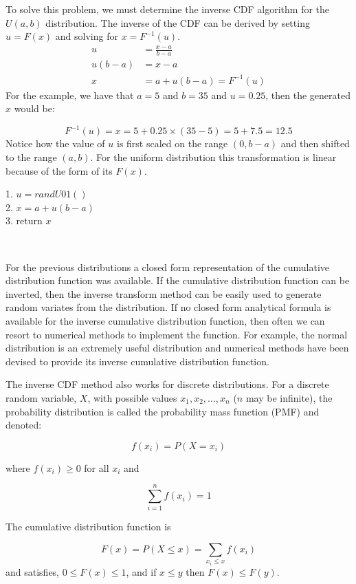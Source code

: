 \documentclass[
]{book}
\theoremstyle{definition}
\theoremstyle{definition}
\theoremstyle{definition}
\theoremstyle{definition}
\theoremstyle{remark}
\begin{document}
To solve this problem, we must determine the inverse CDF algorithm for the \(U(a,b)\) distribution. The inverse of the CDF can be derived by setting \(u = F(x)\) and solving
for \(x = F^{-1}(u)\).
\[
\begin{split}
u & = \frac{x-a}{b-a}\\
u(b-a) &= x-a \\
x & = a + u(b-a) = F^{-1}(u)
\end{split}
\]
For the example, we have that \(a = 5\) and \(b = 35\) and \(u=0.25\), then the generated \(x\) would be:

\[
F^{-1}(u) = x = 5 + 0.25\times(35 - 5) = 5 + 7.5 = 12.5
\]
Notice how the value of \(u\) is first scaled on the range \((0,b-a)\) and then shifted
to the range \((a, b)\). For the uniform distribution this transformation
is linear because of the form of its \(F(x)\).

1. \(u = randU01()\)\\
2. \(x = a + u(b-a)\)\\
3. return \(x\)

~

For the previous distributions a closed form representation of the
cumulative distribution function was available. If the cumulative
distribution function can be inverted, then the inverse transform method
can be easily used to generate random variates from the distribution. If
no closed form analytical formula is available for the inverse
cumulative distribution function, then often we can resort to numerical
methods to implement the function. For example, the normal distribution
is an extremely useful distribution and numerical methods have
been devised to provide its inverse cumulative distribution function.

The inverse CDF method also works for discrete distributions. For a
discrete random variable, \(X\), with possible values \(x_1, x_2, \ldots, x_n\) (\(n\) may be
infinite), the probability distribution is called the probability mass
function (PMF) and denoted:

\[
f\left( {{x_i}} \right) = P\left( {X = {x_i}} \right)
\]

where \(f\left( {{x_i}} \right) \ge 0\) for all \({x_i}\) and

\[
\sum\limits_{i = 1}^n {f\left({{x_i}} \right)}  = 1
\]

The cumulative distribution function is

\[
F(x) = P\left( {X \le x} \right) = \sum\limits_{{x_i} \le x} {f\left( {{x_i}} \right)}
\]
and satisfies, \(0 \le F\left( x \right) \le 1\), and if \(x \le y\) then
\(F(x) \le F(y)\).
\end{document}
